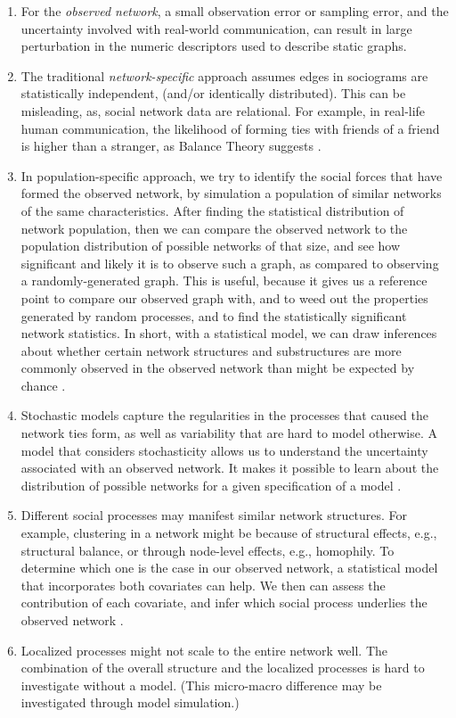 \documentclass[12pt]{report}
\begin{document}
\begin{enumerate}

\item For the \textit{observed network}, a small observation error or sampling error, and the uncertainty involved with real-world communication, can result in large perturbation in the numeric descriptors used to describe static graphs. 

\item The traditional \textit{network-specific} approach assumes edges in sociograms are statistically independent, (and/or identically distributed). This can be misleading, as, social network data are relational. For example, in real-life human communication, the likelihood of forming ties with friends of a friend is higher than a stranger, as Balance Theory suggests \cite{Heider}. 

\item In population-specific approach, we try to identify the social forces that have formed the observed network, by simulation a population of similar networks of the same characteristics. After finding the statistical distribution of network population, then we can compare the observed network to the population distribution of possible networks of that size, and see how significant and likely it is to observe such a graph, as compared to observing a randomly-generated graph. This is useful, because it gives us a reference point to compare our observed graph with, and to weed out the properties generated by random processes, and to find the statistically significant network statistics. In short, with a statistical model, we can draw inferences about whether certain network structures and substructures are more commonly observed in the observed network than might be expected by chance \cite{Robins}. 

\item Stochastic models capture the regularities in the processes that caused the network ties form, as well as variability that are hard to model otherwise. A model that considers stochasticity allows us to understand the uncertainty associated with an observed network. It makes it possible to learn about the distribution of possible networks for a given specification of a model \cite{Robins}.

\item Different social processes may manifest similar network structures. For example, clustering in a network might be because of structural effects, e.g., structural balance, or through node-level effects, e.g., homophily. To determine which one is the case in our observed network, a statistical model that incorporates both covariates can help. We then can assess the contribution of each covariate, and infer which social process underlies the observed network \cite{Robins}. 

\item  Localized processes might not scale to the entire network well. The combination of the overall structure and the localized processes is hard to investigate without a model. (This micro-macro difference may be investigated through model simulation.)\cite{Robins}

\end{enumerate}
\end{document}
